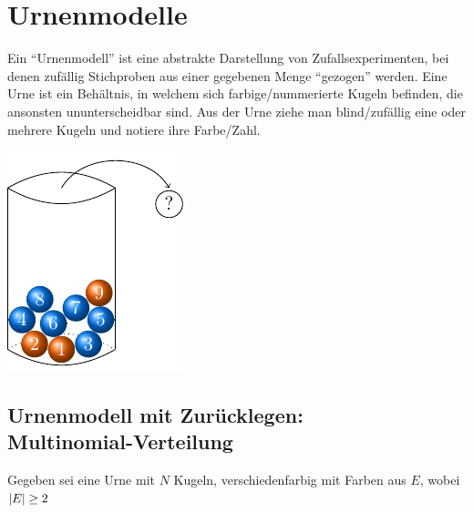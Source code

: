 \section{Urnenmodelle}

Ein ``Urnenmodell'' ist eine abstrakte Darstellung von Zufallsexperimenten, bei denen zufällig Stichproben aus einer gegebenen Menge ``gezogen'' werden.
Eine Urne ist ein Behältnis, in welchem sich farbige/nummerierte Kugeln befinden, die ansonsten ununterscheidbar sind.
Aus der Urne ziehe man blind/zufällig eine oder mehrere Kugeln und notiere ihre Farbe/Zahl.

\begin{center}
    \includegraphics{./stoch_abbildungen/urne_mit_kugeln.pdf}
\end{center}

\subsection[Urnenmodell mit Zurücklegen: Multinomial-Verteilung]{Urnenmodell mit Zurücklegen: \protect\\ Multinomial-Verteilung}

Gegeben sei eine Urne mit $N$ Kugeln, verschiedenfarbig mit Farben aus $E$, wobei $\left| E \right| \ge 2$ 

